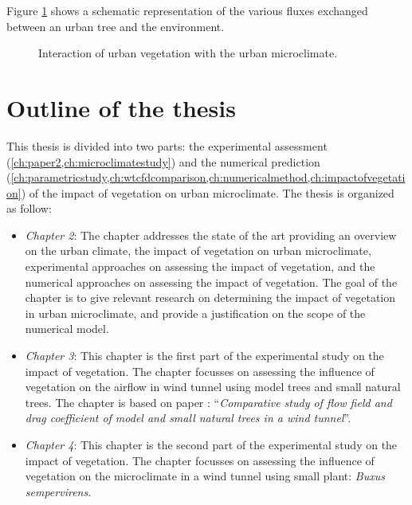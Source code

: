 Figure \ref{fig:vegetation_fluxes} shows a schematic representation of the various fluxes exchanged between an urban tree and the environment. 

\begin{figure}[h]
	\centering
	\caption{Interaction of urban vegetation with the urban microclimate.}
	\label{fig:vegetation_fluxes}
\end{figure}	



\section{Outline of the thesis}

This thesis is divided into two parts: the experimental assessment (\cref{ch:paper2,ch:microclimatestudy}) and the numerical prediction (\cref{ch:parametricstudy,ch:wtcfdcomparison,ch:numericalmethod,ch:impactofvegetation}) of the impact of vegetation on urban microclimate. The thesis is organized as follow:
\begin{itemize}
	\item \textit{Chapter 2}: The chapter addresses the state of the art providing an overview on the urban climate, the impact of vegetation on urban microclimate, experimental approaches on assessing the impact of vegetation, and the numerical approaches on assessing the impact of vegetation. The goal of the chapter is to give relevant research on determining the impact of vegetation in urban microclimate, and provide a justification on the scope of the numerical model. 
	\item \textit{Chapter 3}: This chapter is the first part of the experimental study on the impact of vegetation. The chapter focusses on assessing the influence of vegetation on the airflow in wind tunnel using model trees and small natural trees. The chapter is based on paper \citep{Manickathan2018b}: ``\textit{Comparative study of flow field and drag coefficient of model and small natural trees in a wind tunnel}''.
	\item \textit{Chapter 4}: This chapter is the second part of the experimental study on the impact of vegetation. The chapter focusses on assessing the influence of vegetation on the microclimate in a wind tunnel using small plant: \textit{Buxus sempervirens}.
\end{itemize}
